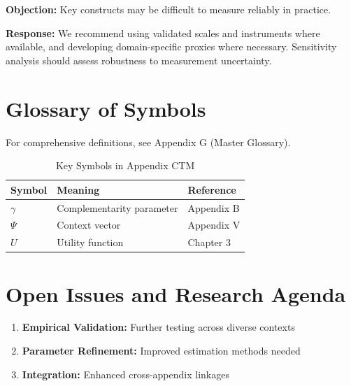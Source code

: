 \textbf{Objection:} Key constructs may be difficult to measure reliably in
practice.

\textbf{Response:} We recommend using validated scales and instruments where
available, and developing domain-specific proxies where necessary. Sensitivity
analysis should assess robustness to measurement uncertainty.



\section{Glossary of Symbols}
\label{sec:ctm-glossary}

For comprehensive definitions, see Appendix G (Master Glossary).

\begin{table}[htbp]
\centering
\caption{Key Symbols in Appendix CTM}
\begin{tabular}{lll}
\toprule
\textbf{Symbol} & \textbf{Meaning} & \textbf{Reference} \\
\midrule
$\gamma$ & Complementarity parameter & Appendix B \\
$\Psi$ & Context vector & Appendix V \\
$U$ & Utility function & Chapter 3 \\
\bottomrule
\end{tabular}
\end{table}



\section{Open Issues and Research Agenda}
\label{sec:ctm-open}

\begin{enumerate}
    \item \textbf{Empirical Validation:} Further testing across diverse contexts
    \item \textbf{Parameter Refinement:} Improved estimation methods needed
    \item \textbf{Integration:} Enhanced cross-appendix linkages
\end{enumerate}

